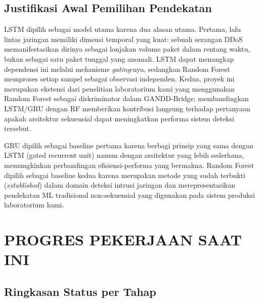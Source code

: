 \documentclass[11pt,a4paper,oneside]{report}
\begin{document}
\section{Justifikasi Awal Pemilihan Pendekatan}

LSTM dipilih sebagai model utama karena dua alasan utama. Pertama, lalu lintas jaringan memiliki dimensi temporal yang kuat: sebuah serangan DDoS memanifestasikan dirinya sebagai lonjakan volume paket dalam rentang waktu, bukan sebagai satu paket tunggal yang anomali. LSTM dapat menangkap dependensi ini melalui mekanisme \textit{gating}-nya, sedangkan Random Forest memproses setiap sampel sebagai observasi independen. Kedua, proyek ini merupakan ekstensi dari penelitian laboratorium kami yang menggunakan Random Forest sebagai diskriminator dalam GANDD-Bridge; membandingkan LSTM/GRU dengan RF memberikan kontribusi langsung terhadap pertanyaan apakah arsitektur sekuensial dapat meningkatkan performa sistem deteksi tersebut.

GRU dipilih sebagai baseline pertama karena berbagi prinsip yang sama dengan LSTM (gated recurrent unit) namun dengan arsitektur yang lebih sederhana, memungkinkan perbandingan efisiensi-performa yang bermakna. Random Forest dipilih sebagai baseline kedua karena merupakan metode yang sudah terbukti (\textit{established}) dalam domain deteksi intrusi jaringan dan merepresentasikan pendekatan ML tradisional non-sekuensial yang digunakan pada sistem produksi laboratorium kami.

\chapter{PROGRES PEKERJAAN SAAT INI}
\label{bab:progres}

\section{Ringkasan Status per Tahap}
\end{document}
